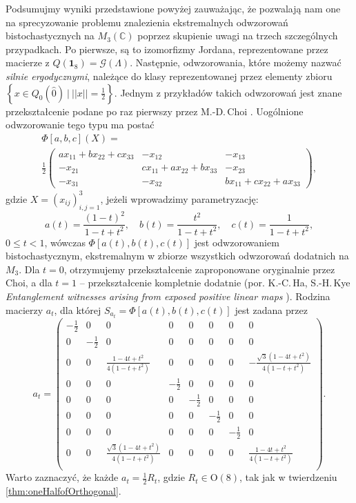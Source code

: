 {\label{com:onlyOneExample}
Podsumujmy wyniki przedstawione powyżej zauważając, że pozwalają nam one
na sprecyzowanie problemu znalezienia ekstremalnych odwzorowań bistochastycznych
na $M_{3}(\mathbb{C})$ poprzez skupienie uwagi na trzech szczególnych
przypadkach.
Po pierwsze, są to izomorfizmy Jordana, reprezentowane przez macierze z
$Q(\mathbf{1}_{8}) = \mathcal{G}(\Lambda)$.
Następnie, odwzorowania, które możemy nazwać \emph{silnie ergodycznymi},
należące do klasy reprezentowanej przez elementy zbioru
$\left \{ x \in Q_{0}(\hat{0}) \:|\: ||x|| = \frac{1}{2} \right \}$.
Jednym z przykładów takich odwzorowań jest znane przekształcenie podane
po raz pierwszy przez M.-D.\,Choi \cite{choi1977extremal}.
Uogólnione odwzorowanie tego typu ma postać
\begin{multline}\label{eq:choi}
\Phi[a,b,c](X)=\\
\frac{1}{2}
\begin{pmatrix}
ax_{11}+bx_{22}+cx_{33} & -x_{12} & -x_{13} \\
-x_{21} & cx_{11}+ax_{22}+bx_{33} & -x_{23} \\
-x_{31} & -x_{32} & bx_{11}+cx_{22}+ax_{33}
\end{pmatrix},
\end{multline}
gdzie $X = (x_{ij})_{i,j = 1}^{3}$,
jeżeli wprowadzimy parametryzację:
\begin{equation}
 a(t)=\dfrac{(1-t)^2}{1-t+t^2},\quad b(t)=\dfrac{t^2}{1-t+t^2},\quad c(t)=\dfrac 1{1-t+t^2},
\end{equation}
$0 \leq t < 1$,
wówczas $\Phi[a(t), b(t), c(t)]$ jest odwzorowaniem bistochastycznym, ekstremalnym
w zbiorze wszystkich odwzorowań dodatnich na $M_{3}$.
Dla $t = 0$, otrzymujemy przekształcenie zaproponowane oryginalnie przez Choi,
a dla $t = 1$ -- przekształcenie kompletnie dodatnie
(por.
K.-C.\,Ha, S.-H.\,Kye \emph{Entanglement witnesses arising from exposed positive linear maps}
\cite{ha2011entanglement}).
Rodzina macierzy $a_{t}$, dla której
$S_{a_{t}} = \Phi[a(t), b(t), c(t)]$ jest zadana przez
\begin{equation}
 a_{t} = \begin{pmatrix}
     - \frac{1}{2} & 0 & 0 & 0 & 0 & 0 & 0 & 0 \\
     0 & - \frac{1}{2} & 0 & 0 & 0 & 0 & 0 & 0 \\
     0 & 0 & \frac{1 - 4t + t^{2}}{4(1 - t + t^{2})} & 0 & 0 & 0 & 0 & - \frac{\sqrt{3}(1 - 4t + t^{2})}{4(1 - t + t^{2})} \\
     0 & 0 & 0 & - \frac{1}{2} & 0 & 0 & 0 & 0 \\
     0 & 0 & 0 & 0 & - \frac{1}{2} & 0 & 0 & 0 \\
     0 & 0 & 0 & 0 & 0 & - \frac{1}{2} & 0 & 0 \\
     0 & 0 & 0 & 0 & 0 & 0 & - \frac{1}{2} & 0 \\
     0 & 0 & \frac{\sqrt{3}(1 - 4t + t^{2})}{4(1 - t + t^{2})} & 0 & 0 & 0 & 0 & \frac{1 - 4t + t^{2}}{4(1 - t + t^{2})} \\
 \end{pmatrix}.
\end{equation}
Warto zaznaczyć, że każde
$a_{t} = \frac{1}{2} R_{t}$, gdzie $R_{t} \in \text{O}(8)$,
tak jak w twierdzeniu \ref{thm:oneHalfofOrthogonal}.

}
